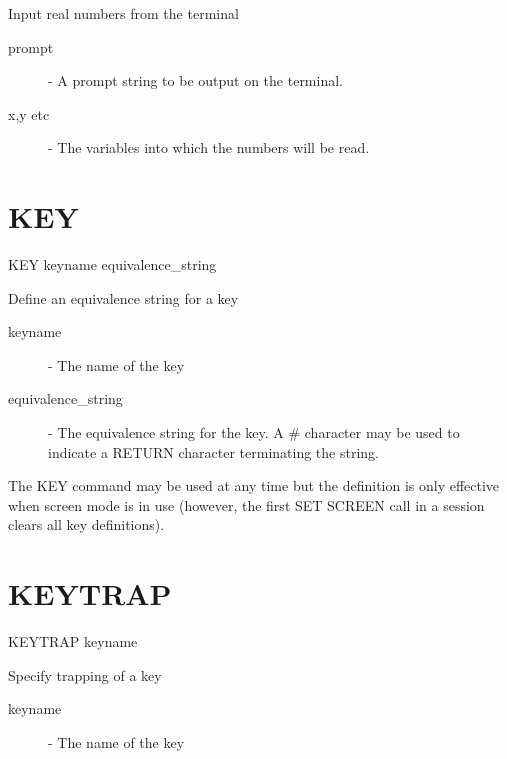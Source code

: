  Input real numbers from the terminal

\begin{description}

\item[prompt]  -  A prompt string to be output on the terminal.

\item[x,y etc] -  The variables into which the numbers will be read.

\end{description}

\section{KEY}

    KEY  \hspace{.5cm} keyname \hspace{.5cm} equivalence\_string
         
 Define an equivalence string for a key

\begin{description}

\item[keyname] -  The name of the key 

\item[equivalence\_string]  -  The equivalence string for the key. A \#
              character may be used to indicate a RETURN character
              terminating the string.

\end{description}
                                     
The KEY command may be used at any time but the definition is only
effective when screen mode is in use (however, the first SET SCREEN call
in a session clears all key definitions).

\section{KEYTRAP}

    KEYTRAP  \hspace{.5cm} keyname 
         
 Specify trapping of a key

\begin{description}

\item[keyname] -  The name of the key 

\end{description}
                                     
